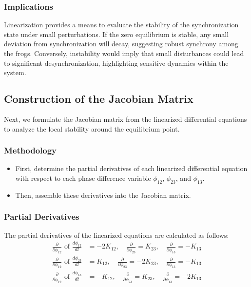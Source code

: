 \documentclass[12pt,a4paper]{article}
\begin{document}
\subsubsection{Implications}
Linearization provides a means to evaluate the stability of the synchronization state under small perturbations. If the zero equilibrium is stable, any small deviation from synchronization will decay, suggesting robust synchrony among the frogs. Conversely, instability would imply that small disturbances could lead to significant desynchronization, highlighting sensitive dynamics within the system.

\subsection{Construction of the Jacobian Matrix}
Next, we formulate the Jacobian matrix from the linearized differential equations to analyze the local stability around the equilibrium point.

\subsubsection{Methodology}
\begin{itemize}
    \item First, determine the partial derivatives of each linearized differential equation with respect to each phase difference variable $\phi_{12}$, $\phi_{23}$, and $\phi_{13}$.
    \item Then, assemble these derivatives into the Jacobian matrix.
\end{itemize}

\subsubsection{Partial Derivatives}
The partial derivatives of the linearized equations are calculated as follows:
\begin{align}
\frac{\partial}{\partial \phi_{12}} \text{  of  } \frac{d\phi_{12}}{dt} &= -2K_{12}, \quad \frac{\partial}{\partial \phi_{23}} = K_{23}, \quad \frac{\partial}{\partial \phi_{13}} = -K_{13} \\
\frac{\partial}{\partial \phi_{12}} \text{  of  } \frac{d\phi_{23}}{dt} &= K_{12}, \quad \frac{\partial}{\partial \phi_{23}} = -2K_{23}, \quad \frac{\partial}{\partial \phi_{13}} = -K_{13} \\
\frac{\partial}{\partial \phi_{12}} \text{  of  } \frac{d\phi_{13}}{dt} &= -K_{12}, \quad \frac{\partial}{\partial \phi_{23}} = K_{23}, \quad \frac{\partial}{\partial \phi_{13}} = -2K_{13}
\end{align}
\end{document}
